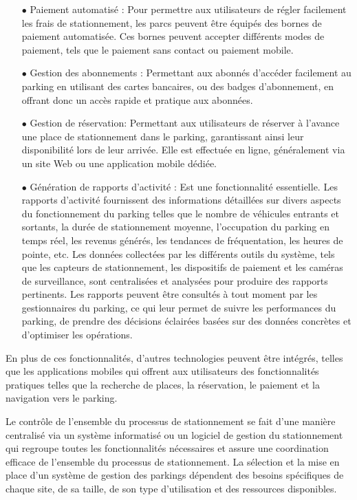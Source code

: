 \begin{enumerate}
    \item [$\bullet$] Paiement automatisé : Pour permettre 
   aux utilisateurs de régler facilement les frais de stationnement, les parcs peuvent être équipés des bornes de paiement automatisée.
   Ces bornes peuvent accepter différents modes de paiement, tels que 
   le paiement sans contact ou paiement mobile.
   \item [$\bullet$] Gestion des abonnements : Permettant aux abonnés d'accéder facilement au parking en utilisant des cartes bancaires, ou des badges d'abonnement, en offrant donc  un accès rapide et pratique aux abonnées.
  \item [$\bullet$] Gestion de réservation: Permettant aux utilisateurs de réserver à l'avance une place de stationnement dans le parking, garantissant ainsi leur disponibilité lors de leur arrivée. Elle est effectuée en ligne, généralement via un site Web ou une application mobile dédiée.
   \item [$\bullet$] Génération de rapports d'activité : Est une fonctionnalité essentielle. Les rapports d'activité fournissent des informations détaillées sur divers aspects du fonctionnement du parking telles que le nombre de véhicules entrants et sortants, la durée de stationnement moyenne, l'occupation du parking en temps réel, les revenus générés, les tendances de fréquentation, les heures de pointe, etc. Les données collectées par les différents outils du système, tels que les capteurs de stationnement, les dispositifs de paiement et les caméras de surveillance, sont centralisées et analysées pour produire des rapports pertinents. Les rapports peuvent être consultés à tout moment par les gestionnaires du parking, ce qui leur permet de suivre les performances du parking, de prendre des décisions éclairées basées sur des données concrètes et d'optimiser les opérations.

\end{enumerate}

En plus de ces fonctionnalités, d'autres technologies peuvent être intégrés, telles que les applications mobiles qui offrent aux utilisateurs des fonctionnalités pratiques telles que la recherche de places, la réservation, le paiement et la navigation vers le parking.

Le contrôle de l'ensemble du processus de stationnement se fait d'une manière centralisé via un système informatisé ou un logiciel de gestion du stationnement qui regroupe toutes les fonctionnalités nécessaires et assure une coordination efficace de l'ensemble du processus de stationnement. 
La sélection et la mise en place d'un système de gestion des parkings dépendent des besoins spécifiques de chaque site, de sa taille, de son type d'utilisation et des ressources disponibles. 

